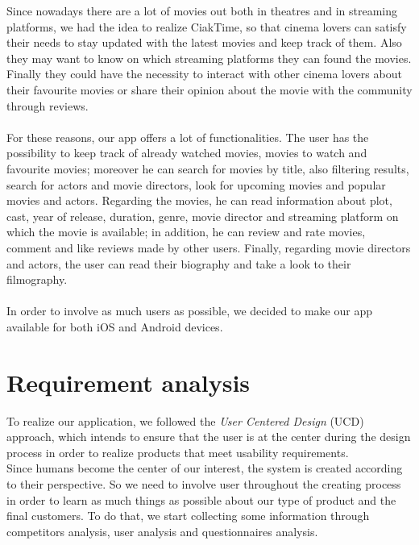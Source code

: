 \documentclass[12pt, a4paper]{article}
\numberwithin{figure}{section}
\begin{document}
Since nowadays there are a lot of movies out
both in theatres and in streaming platforms, we had the idea to realize CiakTime, so that cinema lovers can satisfy their
needs to stay updated with the latest movies and keep track of them.
Also they may want to know on which streaming platforms they can found the movies.
Finally they could have the necessity to interact with other cinema lovers about their
favourite movies or share their opinion about the movie with the community through reviews.
\\\\
For these reasons, our app offers a lot of functionalities.
The user has the possibility to keep track of already watched movies, movies to watch and favourite movies;
moreover he can search for movies by title, also filtering results, search for actors and movie directors,
look for upcoming movies and popular movies and actors.
Regarding the movies, he can read information about plot, cast, year of release, duration, genre,
movie director and streaming platform on which the movie is available; in addition, he can
review and rate movies, comment and like reviews made by other users.
Finally, regarding movie directors and actors, the user can read their biography and take a look to their
filmography.
\\\\
In order to involve as much users as possible, we decided to make our app available for both iOS and Android devices.






\newpage

\section{Requirement analysis}

To realize our application, we followed the \textit{User Centered Design} (UCD)  approach, which intends
to ensure that the user is at the center during the design process in order to realize products
that meet usability requirements.\\
Since humans become the center of our interest, the system is created according to their perspective.
So we need to involve user throughout the creating process in order to learn as much things as possible
about our type of product and the final customers.
To do that, we start collecting some information through competitors analysis, user analysis and
questionnaires analysis.
\end{document}
